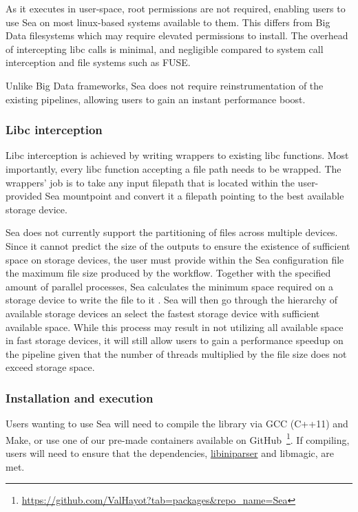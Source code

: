 As it executes in user-space, root permissions are not required, enabling users
to use Sea on most linux-based systems available to them. This differs from Big
Data filesystems which may require elevated permissions to install. The overhead
of intercepting libc calls is minimal, and negligible compared to system call
interception and file systems such as FUSE.

Unlike Big Data frameworks, Sea does not require reinstrumentation of the
existing pipelines, allowing users to gain an instant performance boost.

\subsubsection{Libc interception}

Libc interception is achieved by writing wrappers to existing libc functions.
Most importantly, every libc function accepting a file path needs to be wrapped.
The wrappers' job is to take any input filepath that is located within the
user-provided Sea mountpoint and convert it a filepath pointing to the best
available storage device.

Sea does not currently support the partitioning of files across multiple
devices. Since it cannot predict the size of the outputs to ensure the existence
of sufficient space on storage devices, the user must provide within the Sea
configuration file the maximum file size produced by the workflow. Together with
the specified amount of parallel processes, Sea calculates the minimum space
required on a storage device to write the file to it
. Sea will then go through the hierarchy of available storage devices an select
the fastest storage device with sufficient available space. While this process
may result in not utilizing all available space in fast storage devices, it will
still allow users to gain a performance speedup on the pipeline given that the
number of threads multiplied by the file size does not exceed storage space.

\subsubsection{Installation and execution}
Users wanting to use Sea will need to compile the library via GCC (C++11) and
Make, or use one of our pre-made containers available on
GitHub~\footnote{\url{https://github.com/ValHayot?tab=packages&repo_name=Sea}}.
If compiling, users will need to ensure that the dependencies,
\href{https://github.com/ndevilla/iniparser}{libiniparser} and libmagic, are
met.

